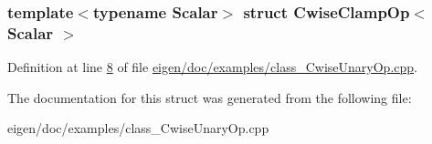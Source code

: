 \subsubsection*{template$<$typename Scalar$>$\newline
struct Cwise\+Clamp\+Op$<$ Scalar $>$}



Definition at line \hyperlink{eigen_2doc_2examples_2class___cwise_unary_op_8cpp_source_l00008}{8} of file \hyperlink{eigen_2doc_2examples_2class___cwise_unary_op_8cpp_source}{eigen/doc/examples/class\+\_\+\+Cwise\+Unary\+Op.\+cpp}.



The documentation for this struct was generated from the following file\+:\begin{DoxyCompactItemize}
\item 
eigen/doc/examples/class\+\_\+\+Cwise\+Unary\+Op.\+cpp\end{DoxyCompactItemize}
